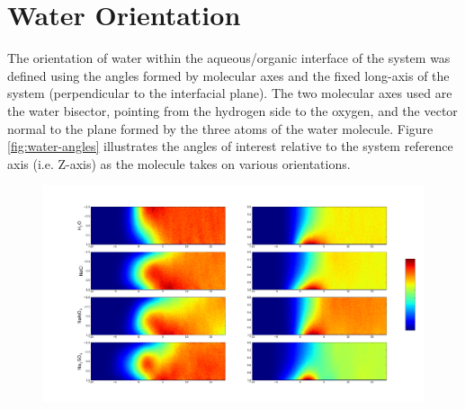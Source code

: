 \section{Water Orientation}
The orientation of water within the aqueous/organic interface of the system was defined using the angles formed by molecular axes and the fixed long-axis of the system (perpendicular to the interfacial plane). The two molecular axes used are the water bisector, pointing from the hydrogen side to the oxygen, and the vector normal to the plane formed by the three atoms of the water molecule. Figure \ref{fig:water-angles} illustrates the angles of interest relative to the system reference axis (i.e. Z-axis) as the molecule takes on various orientations.


\begin{figure}[h!]
\begin{center}
	\includegraphics[scale=0.26]{images/h2o-2dhistograms.png}
	\caption{}
	\label{fig:system-orientations}
\end{center}
\end{figure}


